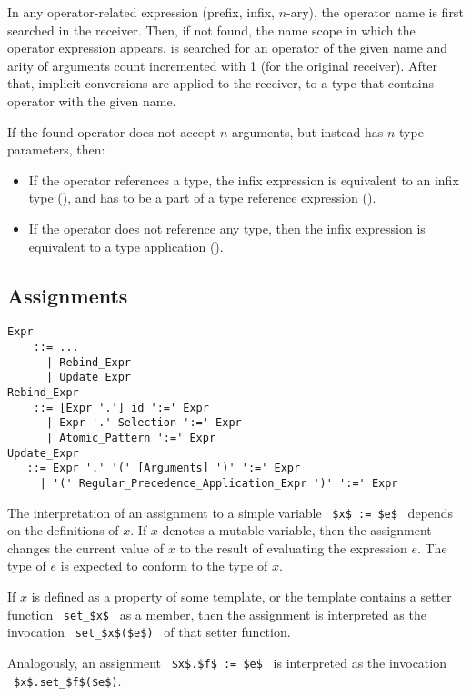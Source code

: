 In any operator-related expression (prefix, infix, $n$-ary), the operator name is first searched in the receiver. Then, if not found, the name scope in which the operator expression appears, is searched for an operator of the given name and arity of arguments count incremented with 1 (for the original receiver). After that, implicit conversions are applied to the receiver, to a type that contains operator with the given name. 

If the found operator does not accept $n$ arguments, but instead has $n$ type parameters, then:
\begin{itemize} 
  \item If the operator references a type, the infix expression is equivalent to an infix type (), and has to be a part of a type reference expression (). 
  \item If the operator does not reference any type, then the infix expression is equivalent to a type application (). 
\end{itemize}





\subsection{Assignments}

\grammar\begin{lstlisting}
Expr
    ::= ...
      | Rebind_Expr
      | Update_Expr
Rebind_Expr 
    ::= [Expr '.'] id ':=' Expr
      | Expr '.' Selection ':=' Expr
      | Atomic_Pattern ':=' Expr
Update_Expr
   ::= Expr '.' '(' [Arguments] ')' ':=' Expr
     | '(' Regular_Precedence_Application_Expr ')' ':=' Expr
\end{lstlisting}

The interpretation of an assignment to a simple variable ~\lstinline!$x$ := $e$!~ depends on the definitions of $x$. If $x$ denotes a mutable variable, then the assignment changes the current value of $x$ to the result of evaluating the expression $e$. The type of $e$ is expected to conform to the type of $x$. 

If $x$ is defined as a property of some template, or the template contains a setter function ~\lstinline!set_$x$!~ as a member, then the assignment is interpreted as the invocation ~\lstinline!set_$x$($e$)!~ of that setter function. 

Analogously, an assignment ~\lstinline!$x$.$f$ := $e$!~ is interpreted as the invocation ~\lstinline!$x$.set_$f$($e$)!. 

